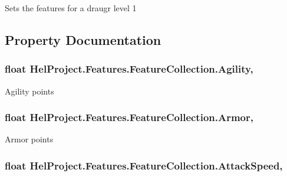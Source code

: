 Sets the features for a draugr level 1 



\subsection{Property Documentation}
\hypertarget{class_hel_project_1_1_features_1_1_feature_collection_a6254f82bffd41e3ca3beacf1928bb409}{}
\subsubsection[{Agility}]{\setlength{\rightskip}{0pt plus 5cm}float Hel\+Project.\+Features.\+Feature\+Collection.\+Agility\hspace{0.3cm}{\ttfamily [get]}, {\ttfamily [set]}}\label{class_hel_project_1_1_features_1_1_feature_collection_a6254f82bffd41e3ca3beacf1928bb409}


Agility points 

\hypertarget{class_hel_project_1_1_features_1_1_feature_collection_a5485b8d9e8d3f4773c4599c66c22c11c}{}
\subsubsection[{Armor}]{\setlength{\rightskip}{0pt plus 5cm}float Hel\+Project.\+Features.\+Feature\+Collection.\+Armor\hspace{0.3cm}{\ttfamily [get]}, {\ttfamily [set]}}\label{class_hel_project_1_1_features_1_1_feature_collection_a5485b8d9e8d3f4773c4599c66c22c11c}


Armor points 

\hypertarget{class_hel_project_1_1_features_1_1_feature_collection_a0e3d5ed05e9d748eaa03e861ca0c6470}{}
\subsubsection[{Attack\+Speed}]{\setlength{\rightskip}{0pt plus 5cm}float Hel\+Project.\+Features.\+Feature\+Collection.\+Attack\+Speed\hspace{0.3cm}{\ttfamily [get]}, {\ttfamily [set]}}\label{class_hel_project_1_1_features_1_1_feature_collection_a0e3d5ed05e9d748eaa03e861ca0c6470}


